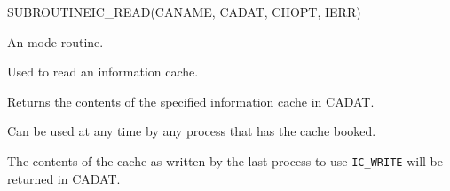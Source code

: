 \begin{routine} %
\subroutine
   {SUBROUTINE}{IC\_READ}{(CANAME, CADAT, CHOPT, IERR)}
\begin{overview}
An \info mode routine.

Used to read an information cache.
\end{overview}
\begin{argdeflist}
\end{argdeflist}
\begin{describe}

Returns the contents of the specified information cache in CADAT.

Can be used at any time by any process that has the cache booked.

The contents of the cache as written by the last process to use
\verb|IC_WRITE| will be returned in CADAT.

\end{describe}
\begin{options}
\end{options}
\begin{returncodes}
\end{returncodes}
\end{routine}


